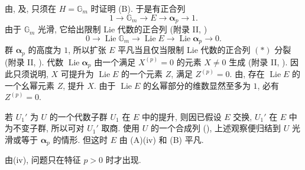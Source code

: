 由, 
及, 只须在 \(H=\mathbb G_m\) 时证明 (B).
于是有正合列
\[
  1\longrightarrow\mathbb G_m\longrightarrow E
    \longrightarrow\boldsymbol\alpha_p\longrightarrow1.
\]
由于 \(\mathbb G_m\) 光滑, 它给出限制 Lie 代数的正合列
(附录 II, )
\begin{equation}
  0\longrightarrow\operatorname{Lie}\mathbb G_m
    \longrightarrow\operatorname{Lie}E
    \longrightarrow\operatorname{Lie}\boldsymbol\alpha_p
    \longrightarrow0.
  \tag{*}\label{sga3:xvii:subsection:6-3:equation:star}
\end{equation}
群 \(\boldsymbol\alpha_p\) 的高度为 \(1\),
所以扩张 \(E\) 平凡当且仅当限制 Lie 代数的正合列 \((*)\) 分裂
(附录 II, ).
代数 \(\operatorname{Lie}\boldsymbol\alpha_p\) 由一个满足 \(X^{(p)}=0\)
的元素 \(X\ne0\) 生成 (附录 II, ).
因此只须说明, \(X\) 可提升为 \(\operatorname{Lie}E\) 的一个元素 \(Z\),
满足 \(Z^{(p)}=0\).
由,
存在 \(\operatorname{Lie}E\) 的一个幺幂元素 \(Z\), 提升 \(X\).
由于 \(\operatorname{Lie}E\) 的幺幂部分的维数显然至多为 \(1\),
必有 \(Z^{(p)}=0\).

若 \(U_1'\) 为 \(U\) 的一个代数子群 \(U_1\) 在 \(E\) 中的提升,
则因已假设 \(E\) 交换, \(U_1'\) 在 \(E\) 中为不变子群,
所以可对 \(U_1'\) 取商.
使用 \(U\) 的一个合成列 (),
上述观察便归结到 \(U\) 光滑或等于 \(\boldsymbol\alpha_p\) 的情形.
但这时 \(E\) 由 (A)(iv) 和 (B) 平凡.


由(iv),
问题只在特征 \(p>0\) 时才出现.


